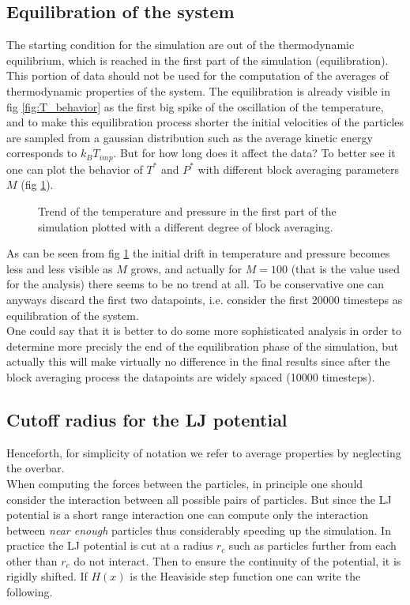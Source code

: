 \documentclass[a4paper, 11pt]{article}
\begin{document}
  \subsection{Equilibration of the system}
    The starting condition for the simulation are out of the thermodynamic equilibrium, which is reached in the first part of the simulation (equilibration). This portion of data should not be used for the computation of the averages of thermodynamic properties of the system. The equilibration is already visible in fig \ref{fig:T_behavior} as the first big spike of the oscillation of the temperature, and to make this equilibration process shorter the initial velocities of the particles are sampled from a gaussian distribution such as the average kinetic energy corresponds to $k_B T_{imp}$. But for how long does it affect the data? To better see it one can plot the behavior of $T^*$ and $P^*$ with different block averaging parameters $M$ (fig \ref{fig:equilibration}).

    \begin{figure}[H]
      \centering
       \hspace{-0.5cm}
      \caption{Trend of the temperature and pressure in the first part of the simulation plotted with a different degree of block averaging.}
      \label{fig:equilibration}
    \end{figure}

    As can be seen from fig \ref{fig:equilibration} the initial drift in temperature and pressure becomes less and less visible as $M$ grows, and actually for $M = 100$ (that is the value used for the analysis) there seems to be no trend at all. To be conservative one can anyways discard the first two datapoints, i.e. consider the first 20000 timesteps as equilibration of the system. \\
    One could say that it is better to do some more sophisticated analysis in order to determine more precisly the end of the equilibration phase of the simulation, but actually this will make virtually no difference in the final results since after the block averaging process the datapoints are widely spaced (10000 timesteps).

  \subsection{Cutoff radius for the LJ potential}
    Henceforth, for simplicity of notation we refer to average properties by neglecting the overbar. \\
    When computing the forces between the particles, in principle one should consider the interaction between all possible pairs of particles. But since the LJ potential is a short range interaction one can compute only the interaction between \emph{near enough} particles thus considerably speeding up the simulation. In practice the LJ potential is cut at a radius $r_c$ such as particles further from each other than $r_c$ do not interact. Then to ensure the continuity of the potential, it is rigidly shifted. If $H(x)$ is the Heaviside step function one can write the following.
\end{document}
